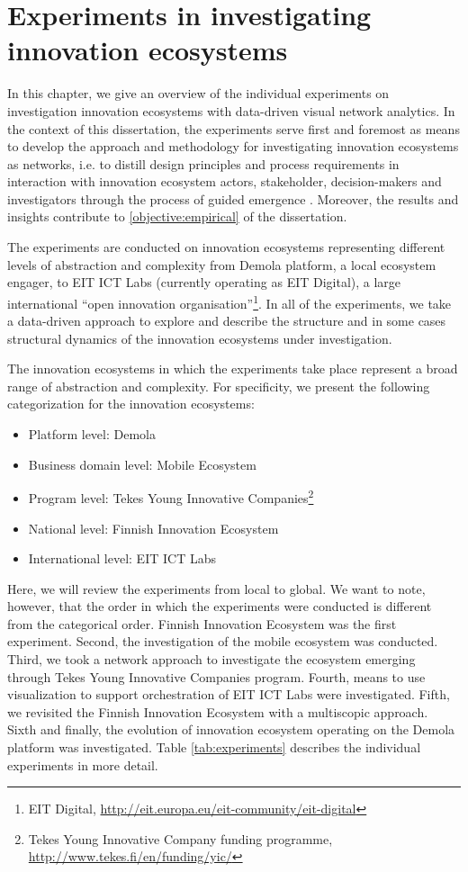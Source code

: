 \chapter{Experiments in investigating innovation ecosystems}
\label{ch:experiments}

In this chapter, we give an overview of the individual experiments on investigation innovation ecosystems with data-driven visual network analytics. In the context of this dissertation, the experiments serve first and foremost as means to develop the approach and methodology for investigating innovation ecosystems as networks, i.e. to distill design principles and process requirements in interaction with innovation ecosystem actors, stakeholder, decision-makers and investigators through the process of guided emergence \citep[cf.][]{Sein2011ActionResearch}. Moreover, the results and insights contribute to \ref{objective:empirical} of the dissertation.

The experiments are conducted on innovation ecosystems representing different levels of abstraction and complexity from Demola platform, a local ecosystem engager, to EIT ICT Labs (currently operating as EIT Digital), a large international ``open innovation organisation''\footnote{EIT Digital, \url{http://eit.europa.eu/eit-community/eit-digital}}. In all of the experiments, we take a data-driven approach to explore and describe the structure and in some cases structural dynamics of the innovation ecosystems under investigation.

The innovation ecosystems in which the experiments take place represent a broad range of abstraction and complexity. For specificity, we present the following categorization for the innovation ecosystems:

\begin{itemize} 
  \item Platform level: Demola
  \item Business domain level: Mobile Ecosystem 
  \item Program level: Tekes Young Innovative Companies\footnote{Tekes Young Innovative Company funding programme, \url{http://www.tekes.fi/en/funding/yic/}}
  \item National level: Finnish Innovation Ecosystem
  \item International level: EIT ICT Labs
\end{itemize}

Here, we will review the experiments from local to global. We want to note, however, that the order in which the experiments were conducted is different from the categorical order. Finnish Innovation Ecosystem was the first experiment. Second, the investigation of the mobile ecosystem was conducted. Third, we took a network approach to investigate the ecosystem emerging through Tekes Young Innovative Companies program. Fourth, means to use visualization to support orchestration of EIT ICT Labs were investigated. Fifth, we revisited the Finnish Innovation Ecosystem with a multiscopic approach. Sixth and finally, the evolution of innovation ecosystem operating on the Demola platform was investigated. Table \ref{tab:experiments} describes the individual experiments in more detail.
 
